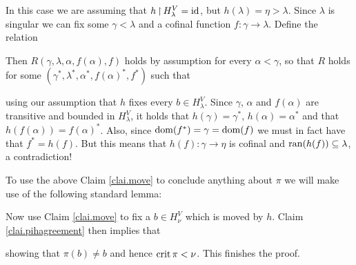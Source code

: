 \documentclass[../../main]{subfiles}
\begin{document}
{{    

    \qquad In this case we are assuming that $h\operatorname{\upharpoonright} H_\lambda^V = \operatorname{id}$, but $h(\lambda) = \eta > \lambda$. Since $\lambda$ is singular we can fix some $\gamma<\lambda$ and a cofinal function $f\colon\gamma\to\lambda$. Define the relation

    Then $R(\gamma,\lambda,\alpha,f(\alpha),f)$ holds by assumption for every $\alpha<\gamma$, so that $R$ holds for some $(\gamma^*,\lambda^*,\alpha^*,f(\alpha)^*,f^*)$ such that

     using our assumption that $h$ fixes every $b\in H_\lambda^V$. Since $\gamma$, $\alpha$ and $f(\alpha)$ are transitive and bounded in $H_\lambda^V$, it holds that $h(\gamma)=\gamma^*$, $h(\alpha)=\alpha^*$ and that $h(f(\alpha))=f(\alpha)^*$. Also, since $\operatorname{dom}(f^*)=\gamma=\operatorname{dom}(f)$ we must in fact have that $f^*=h(f)$. But this means that $h(f)\colon\gamma\to\eta$ is cofinal and $\operatorname{ran}(h(f))\subseteq\lambda$, a contradiction!
  }
  
  To use the above Claim \ref{clai.move} to conclude anything about $\pi$ we will make use of the following standard lemma:



  Now use Claim \ref{clai.move} to fix a $b\in H_\nu^V$ which is moved by $h$. Claim \ref{clai.pihagreement} then implies that

  showing that $\pi(b)\neq b$ and hence $\operatorname{crit}\pi<\nu$. This finishes the proof.
}
\end{document}
